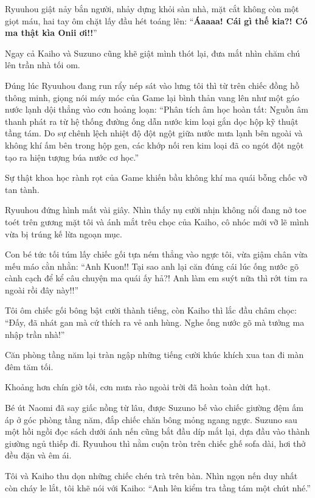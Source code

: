 \documentclass[../main.tex]{subfiles}
\begin{document}
Ryuuhou giật nảy bắn người, nhảy dựng khỏi sàn nhà, mặt cắt không còn một giọt máu, hai tay ôm chặt lấy đầu hét toáng lên: ``\textbf{Áaaaa! Cái gì thế kia?! Có ma thật kìa Onii ơi!!}''

Ngay cả Kaiho và Suzuno cũng khẽ giật mình thót lại, đưa mắt nhìn chăm chú lên trần nhà tối om.

Đúng lúc Ryuuhou đang run rẩy nép sát vào lưng tôi thì từ trên chiếc đồng hồ thông minh, giọng nói máy móc của Game lại bình thản vang lên như một gáo nước lạnh dội thẳng vào cơn hoảng loạn: ``Phân tích âm học hoàn tất: Nguồn âm thanh phát ra từ hệ thống đường ống dẫn nước kim loại gắn dọc hộp kỹ thuật tầng tám. Do sự chênh lệch nhiệt độ đột ngột giữa nước mưa lạnh bên ngoài và không khí ấm bên trong hộp gen, các khớp nối ren kim loại đã co ngót đột ngột tạo ra hiện tượng búa nước cơ học.''

Sự thật khoa học rành rọt của Game khiến bầu không khí ma quái bỗng chốc vỡ tan tành.

Ryuuhou đứng hình mất vài giây. Nhìn thấy nụ cười nhịn không nổi đang nở toe toét trên gương mặt tôi và ánh mắt trêu chọc của Kaiho, cô nhóc mới vỡ lẽ mình vừa bị trúng kế lừa ngoạn mục.

Con bé tức tối túm lấy chiếc gối tựa ném thẳng vào ngực tôi, vừa giậm chân vừa mếu máo cằn nhằn: ``Anh Kuon!! Tại sao anh lại căn đúng cái lúc ống nước gõ cành cạch để kể câu chuyện ma quái ấy hả?! Anh làm em suýt nữa thì rớt tim ra ngoài rồi đây này!!''

Tôi ôm chiếc gối bông bật cười thành tiếng, còn Kaiho thì lắc đầu châm chọc: ``Đấy, đã nhát gan mà cứ thích ra vẻ anh hùng. Nghe ống nước gõ mà tưởng ma nhập trần nhà!''

Căn phòng tầng năm lại tràn ngập những tiếng cười khúc khích xua tan đi màn đêm tăm tối.

\ct

Khoảng hơn chín giờ tối, cơn mưa rào ngoài trời đã hoàn toàn dứt hạt.

Bé út Naomi đã say giấc nồng từ lâu, được Suzuno bế vào chiếc giường đệm ấm áp ở góc phòng tầng năm, đắp chiếc chăn bông mỏng ngang ngực. Suzuno sau một hồi ngồi đọc sách dưới ánh nến cũng bắt đầu díp mắt lại, dựa đầu vào thành giường ngủ thiếp đi. Ryuuhou thì nằm cuộn tròn trên chiếc ghế sofa dài, hơi thở đều đặn và êm ái.

Tôi và Kaiho thu dọn những chiếc chén trà trên bàn. Nhìn ngọn nến duy nhất còn cháy le lắt, tôi khẽ nói với Kaiho: ``Anh lên kiểm tra tầng tám một chút nhé.''
\end{document}
